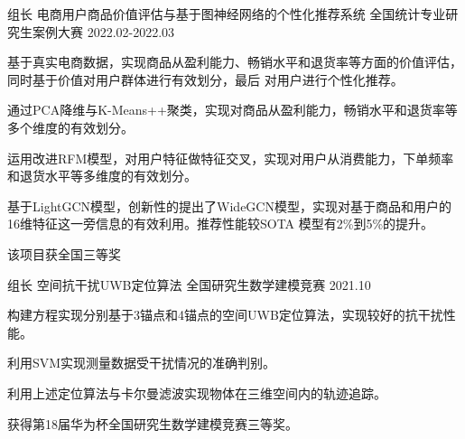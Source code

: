 \begin{cventries}
\cventry
{组长} %
{电商用户商品价值评估与基于图神经网络的个性化推荐系统} %
{全国统计专业研究生案例大赛} %
{2022.02-2022.03} %
{
  \begin{cvitems} %
    \item {基于真实电商数据，实现商品从盈利能力、畅销水平和退货率等方面的价值评估，同时基于价值对用户群体进行有效划分，最后
    对用户进行个性化推荐。}
    \item {通过PCA降维与K-Means++聚类，实现对商品从盈利能力，畅销水平和退货率等多个维度的有效划分。}
    \item {运用改进RFM模型，对用户特征做特征交叉，实现对用户从消费能力，下单频率和退货水平等多维度的有效划分。}
    \item {基于LightGCN模型，创新性的提出了WideGCN模型，实现对基于商品和用户的16维特征这一旁信息的有效利用。推荐性能较SOTA
    模型有2\%到5\%的提升。}
    \item {该项目获全国三等奖}
  \end{cvitems}
}

\cventry
{组长} %
{空间抗干扰UWB定位算法} %
{全国研究生数学建模竞赛} %
{2021.10} %
{
  \begin{cvitems} %
    \item {构建方程实现分别基于3锚点和4锚点的空间UWB定位算法，实现较好的抗干扰性能。}
    \item {利用SVM实现测量数据受干扰情况的准确判别。}
    \item {利用上述定位算法与卡尔曼滤波实现物体在三维空间内的轨迹追踪。}
    \item {获得第18届华为杯全国研究生数学建模竞赛三等奖。}
  \end{cvitems}
}

\end{cventries}
